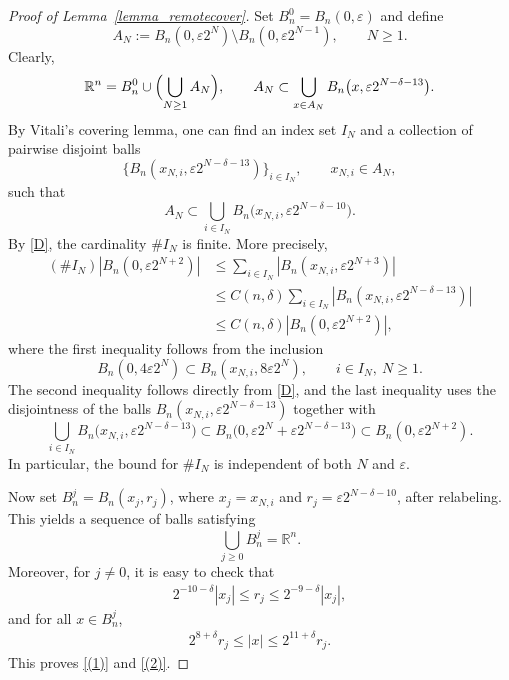 \documentclass[12pt]{amsart}
\begin{document}
\begin{proof}[Proof of Lemma~\ref{lemma_remotecover}]
Set $B_n^0 = B_n(0,\varepsilon)$ and define
\[
A_N:= B_n(0, \varepsilon 2^{N}) \setminus B_n(0, \varepsilon 2^{N-1}), \qquad N\ge 1.
\]
Clearly,
\begin{align*}
    \mathbb{R}^n = B_n^0 \cup \Bigl(\bigcup_{N\ge 1}A_N\Bigr),\qquad
    A_N \subset \bigcup_{x\in A_N} B_n \bigl(x, \varepsilon 2^{N-\delta-13}\bigr).
\end{align*}
By Vitali's covering lemma, one can find an index set $I_N$ and a collection of pairwise disjoint balls
\[
\{B_n(x_{N,i},\varepsilon 2^{N-\delta-13})\}_{i\in I_N},
\qquad x_{N,i}\in A_N,
\]
such that
\[
A_N \subset \bigcup_{i\in I_N}B_n\bigl(x_{N,i}, \varepsilon 2^{N-\delta-10}\bigr).
\]
By \eqref{D}, the cardinality $\# I_N$ is finite. More precisely,
\begin{align*}
    (\# I_N) |B_n(0,\varepsilon 2^{N+2})|
    &\le \sum_{i \in I_N} |B_n(x_{N,i}, \varepsilon 2^{N+3})| \\
    &\le C(n,\delta) \sum_{i \in I_N} |B_n(x_{N,i}, \varepsilon 2^{N-\delta-13})|\\
    &\le C(n,\delta) |B_n(0,\varepsilon 2^{N+2})|,
\end{align*}
where the first inequality follows from the inclusion
\[
B_n(0,4\varepsilon 2^{N}) \subset B_n( x_{N,i}, 8 \varepsilon 2^N ),
\qquad i\in I_N,\ N\ge 1.
\]
The second inequality follows directly from \eqref{D}, and the last inequality uses the disjointness of the balls $B_n(x_{N,i},\varepsilon 2^{N-\delta-13})$ together with
\begin{equation*}
    \bigcup_{i\in I_N} B_n\bigl(x_{N,i},\varepsilon 2^{N-\delta-13}\bigr)
    \subset B_n\bigl(0, \varepsilon 2^N + \varepsilon 2^{N-\delta-13}\bigr)
    \subset B_n( 0, \varepsilon 2^{N+2} ).
\end{equation*}
In particular, the bound for $\# I_N$ is independent of both $N$ and $\varepsilon$.

Now set $B_n^j = B_n(x_{j}, r_j)$, where $x_j = x_{N,i}$ and $r_j = \varepsilon 2^{N-\delta-10}$, after relabeling. This yields a sequence of balls satisfying
\[
\bigcup_{j \ge 0}B_n^j = \mathbb{R}^n.
\]
Moreover, for $j \ne 0$, it is easy to check that
\begin{align}\label{eq_|xj|,r_j}
2^{-10-\delta} |x_j| \le r_j \le 2^{-9-\delta} |x_j|,
\end{align}
and for all $x\in B_n^j$,
\begin{align}\label{eq_|x|,r_j}
    2^{8+\delta} r_j \le |x| \le 2^{11+\delta}r_j.
\end{align}
This proves \eqref{(1)} and \eqref{(2)}.


\end{proof}
\end{document}
